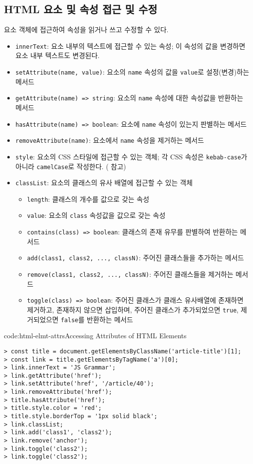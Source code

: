 \subsection*{HTML 요소 및 속성 접근 및 수정}

요소 객체에 접근하여 속성을 읽거나 쓰고 수정할 수 있다.

\begin{itemize}
    \item \texttt{innerText}: 요소 내부의 텍스트에 접근할 수 있는 속성; 이 속성의 값을 변경하면 요소 내부 텍스트도 변경된다.
    \item \texttt{setAttribute(name, value)}: 요소의 \texttt{name} 속성의 값을 \texttt{value}로 설정(변경)하는 메서드
    \item \texttt{getAttribute(name) => string}: 요소의 \texttt{name} 속성에 대한 속성값을 반환하는 메서드
    \item \texttt{hasAttribute(name) => boolean}: 요소에 \texttt{name} 속성이 있는지 판별하는 메서드
    \item \texttt{removeAttribute(name)}: 요소에서 \texttt{name} 속성을 제거하는 메서드
    \item \texttt{style}: 요소의 CSS 스타일에 접근할 수 있는 객체; 각 CSS 속성은 \texttt{kebab-case}가 아니라 \texttt{camelCase}로 작성한다. ( 참고)
    \newpage
    \item \texttt{classList}: 요소의 클래스의 유사 배열에 접근할 수 있는 객체
    \begin{itemize}
      \item \texttt{length}: 클래스의 개수를 값으로 갖는 속성
      \item \texttt{value}: 요소의 \texttt{class} 속성값을 값으로 갖는 속성
      \item \texttt{contains(class) => boolean}: 클래스의 존재 유무를 판별하여 반환하는 메서드
      \item \texttt{add(class1, class2, ..., classN)}: 주어진 클래스들을 추가하는 메서드
      \item \texttt{remove(class1, class2, ..., classN)}: 주어진 클래스들을 제거하는 메서드
      \item \texttt{toggle(class) => boolean}: 주어진 클래스가 클래스 유사배열에 존재하면 제거하고, 존재하지 않으면 삽입하며, 주어진 클래스가 추가되었으면 \texttt{true}, 제거되었으면 \texttt{false}를 반환하는 메서드
    \end{itemize}
\end{itemize}

\begin{codeenv}{code:html-elmt-attrs}{Accessing Attributes of HTML Elements}\begin{verbatim}
> const title = document.getElementsByClassName('article-title')[1];
> const link = title.getElementsByTagName('a')[0];
> link.innerText = 'JS Grammar';
> link.getAttribute('href');
> link.setAttribute('href', '/article/40');
> link.removeAttribute('href');
> title.hasAttribute('href');
> title.style.color = 'red';
> title.style.borderTop = '1px solid black';
> link.classList;
> link.add('class1', 'class2');
> link.remove('anchor');
> link.toggle('class2');
> link.toggle('class2');
\end{verbatim}
\end{codeenv}

